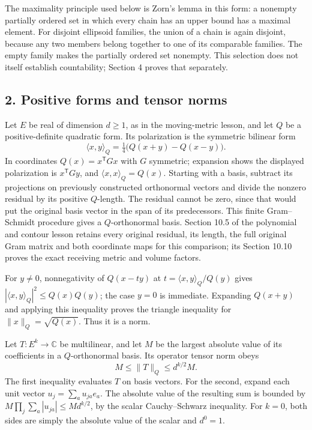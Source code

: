 \documentclass[
  11pt,
]{article}
\begin{document}
The maximality principle used below is Zorn's lemma in this form: a
nonempty partially ordered set in which every chain has an upper bound
has a maximal element. For disjoint ellipsoid families, the union of a
chain is again disjoint, because any two members belong together to one
of its comparable families. The empty family makes the partially ordered
set nonempty. This selection does not itself establish countability;
Section 4 proves that separately.

\subsection{2. Positive forms and tensor
norms}\label{positive-forms-and-tensor-norms}

Let \(E\) be real of dimension \(d\geq1\), as in the moving-metric
lesson, and let \(Q\) be a positive-definite quadratic form. Its
polarization is the symmetric bilinear form \[
\langle x,y\rangle_Q=\tfrac14\bigl(Q(x+y)-Q(x-y)\bigr).
\] In coordinates \(Q(x)=x^{\mathsf T}Gx\) with \(G\) symmetric;
expansion shows the displayed polarization is \(x^{\mathsf T}Gy\), and
\(\langle x,x\rangle_Q=Q(x)\). Starting with a basis, subtract its
projections on previously constructed orthonormal vectors and divide the
nonzero residual by its positive \(Q\)-length. The residual cannot be
zero, since that would put the original basis vector in the span of its
predecessors. This finite Gram--Schmidt procedure gives a
\(Q\)-orthonormal basis. Section 10.5 of the polynomial and contour
lesson retains every original residual, its length, the full original
Gram matrix and both coordinate maps for this comparison; its Section
10.10 proves the exact receiving metric and volume factors.

For \(y\ne0\), nonnegativity of \(Q(x-t y)\) at
\(t=\langle x,y\rangle_Q/Q(y)\) gives
\(|\langle x,y\rangle_Q|^2\leq Q(x)Q(y)\); the case \(y=0\) is
immediate. Expanding \(Q(x+y)\) and applying this inequality proves the
triangle inequality for \(\|x\|_Q=\sqrt{Q(x)}\). Thus it is a norm.

Let \(T:E^k\to\mathbb C\) be multilinear, and let \(M\) be the largest
absolute value of its coefficients in a \(Q\)-orthonormal basis. Its
operator tensor norm obeys \[
M\leq\|T\|_Q\leq d^{k/2}M.
\] The first inequality evaluates \(T\) on basis vectors. For the
second, expand each unit vector \(u_j=\sum_a u_{ja}e_a\). The absolute
value of the resulting sum is bounded by
\(M\prod_j\sum_a|u_{ja}|\leq M d^{k/2}\), by the scalar Cauchy--Schwarz
inequality. For \(k=0\), both sides are simply the absolute value of the
scalar and \(d^0=1\).
\end{document}
